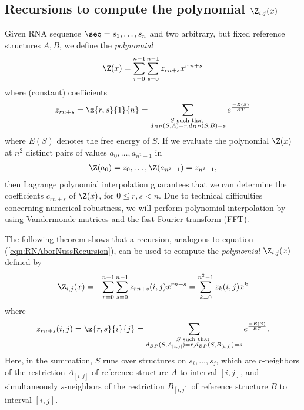 \subsection{Recursions to compute the polynomial $\Z_{i,j}(x)$}
\label{section:recursionsForPolynomialZij}

Given RNA sequence $\seq = s_1,\ldots,s_n$
and two arbitrary, but fixed reference
structures $A,B$, we define the {\em polynomial}
\begin{eqnarray}
\label{eqn:polynomialYann}
\Z(x) = \sum_{r=0}^{n-1} \sum_{s=0}^{n-1}  z_{rn+s} x^{r\cdot n + s}
\end{eqnarray}
where (constant) coefficients
\[ z_{rn+s}= \z{r,s}{1}{n} =
\sum_{\substack{S \text{ such that }\\
d_{BP}(S,A)=r, d_{BP}(S,B)=s}}
e^{\frac{-E(S)}{RT}}
\]
where $E(S)$ denotes the free energy of $S$.
If we evaluate the polynomial $\Z(x)$ at $n^2$ distinct pairs of values
$a_0,\ldots,a_{n^2-1}$ in
\begin{eqnarray}
\label{eqn:ZofX}
\Z(a_{0}) = z_{0},\ldots, \Z(a_{n^2-1}) = z_{n^2-1},
\end{eqnarray}
then Lagrange polynomial interpolation
guarantees that we can determine the coefficients $c_{rn+s}$ of $\Z(x)$,
for $0\leq r,s < n$. Due to technical difficulties concerning numerical
robustness, we will perform polynomial interpolation by using Vandermonde
matrices and the fast Fourier transform (FFT).

The following theorem shows that a
recursion, analogous to equation (\ref{eqn:RNAborNussRecursion}),
can be used to compute
the {\em polynomial} $\Z_{i,j}(x)$ defined by
\begin{eqnarray}
\label{eqn:defZijpolynomial}
\Z_{i,j}(x) &=& \sum_{r=0}^{n-1} \sum_{s=0}^{n-1}
z_{rn+s}(i,j) x^{rn+s}
=\sum_{k=0}^{n^2-1} z_{k}(i,j) x^{k}
\end{eqnarray}
where
\[ z_{rn+s}(i,j)= \z{r,s}{i}{j} =
\sum_{\substack{S \text{ such that }\\
d_{BP}(S,A_{[i,j]})=r, d_{BP}(S,B_{[i,j]})=s}}
e^{\frac{-E(S)}{RT}}.
\]
Here, in the summation, $S$ runs over structures on $s_i,\ldots,s_j$, which
are $r$-neighbors of the restriction $A_{[i,j]}$ of reference structure
$A$ to interval $[i,j]$, and simultaneously
$s$-neighbors of the restriction $B_{[i,j]}$ of reference structure
$B$ to interval $[i,j]$.
\medskip


